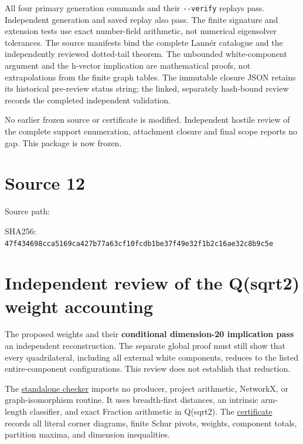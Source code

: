 \documentclass[
  10pt,
]{report}
\begin{document}
All four primary generation commands and their \texttt{-\/-verify}
replays pass. Independent generation and saved replay also pass. The
finite signature and extension tests use exact number-field arithmetic,
not numerical eigensolver tolerances. The source manifests bind the
complete Lannér catalogue and the independently reviewed dotted-tail
theorem. The unbounded white-component argument and the h-vector
implication are mathematical proofs, not extrapolations from the finite
graph tables. The immutable closure JSON retains its historical
pre-review status string; the linked, separately hash-bound review
records the completed independent validation.

No earlier frozen source or certificate is modified. Independent hostile
review of the complete support enumeration, attachment closure and final
scope reports no gap. This package is now frozen.

\clearpage

\chapter{Source 12}\label{source-12}

Source path: 

SHA256:
\nolinkurl{47f434698cca5169ca427b77a63cf10fcdb1be37f49e32f1b2c16ae32c8b9c5e}

\chapter{Independent review of the Q(sqrt2) weight
accounting}\label{independent-review-of-the-qsqrt2-weight-accounting}

The proposed weights and their \textbf{conditional dimension-20
implication pass} an independent reconstruction. The separate global
proof must still show that every quadrilateral, including all external
white components, reduces to the listed entire-component configurations.
This review does not establish that reduction.

The
\href{../scripts/fresh_sqrt2_weight_bound_20261015_review.py}{standalone
checker} imports no producer, project arithmetic, NetworkX, or
graph-isomorphism routine. It uses breadth-first distances, an intrinsic
arm-length classifier, and exact Fraction arithmetic in Q(sqrt2). The
\href{fresh_sqrt2_weight_bound_20261015_review.json}{certificate}
records all literal corner diagrams, finite Schur pivots, weights,
component totals, partition maxima, and dimension inequalities.
\end{document}
